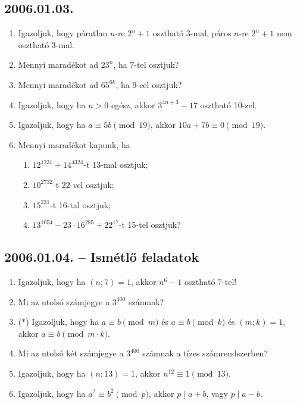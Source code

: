 \documentclass{article}
\newenvironment{abc}{\begin{enumerate}[label=\textit{\alph*})]}{\end{enumerate}}
\begin{document}
\subsection*{2006.01.03.}
\begin{enumerate}
 
\item Igazoljuk, hogy páratlan $n$-re $2^n+1$ osztható 3-mal, páros $n$-re $2^n+1$ nem osztható 3-mal. 

\item Mennyi maradékot ad $23^n$, ha 7-tel osztjuk?

\item Mennyi maradékot ad $65^{6k}$, ha 9-cel osztjuk?

\item Igazoljuk, hogy ha $n>0$ egész, akkor $3^{4n+3}-17$ osztható 10-zel.

\item Igazoljuk, hogy ha $a \equiv 5b \pmod{19}$, akkor $10a+7b \equiv 0 \pmod{19}$.

\item Mennyi maradékot kapunk, ha 

\begin{abc}

	\item $12^{1231}+14^{4324}$-t 13-mal osztjuk;
	\item $10^{2732}$-t 22-vel osztjuk;
	\item $15^{231}$-t 16-tal osztjuk;
	\item $13^{1054}-23 \cdot 16^{285}+22^{17}$-t 15-tel osztjuk?
 
\end{abc}

\end{enumerate}

\subsection*{2006.01.04. -- Ismétlő feladatok}
\begin{enumerate}
\item Igazoljuk, hogy ha $(n;7)=1$, akkor $n^6-1$ osztható 7-tel!

\item Mi az utolsó számjegye a $3^{400}$ számnak?

\item ($*$) Igazoljuk, hogy ha $a\equiv b \pmod m$ és $a \equiv b \pmod k$ és $(m;k)=1$, akkor 
$a\equiv b \pmod {m \cdot k}$.

\item Mi az utolsó két számjegye a $3^{400}$ számnak a tízes számrendszerben?

\item Igazoljuk, hogy ha $(n;13)=1$, akkor $n^{12} \equiv 1 \pmod {13}$.

\item Igazoljuk, hogy ha $a^2 \equiv b^2 \pmod p$, akkor $p \mid a+b$, vagy $p \mid a-b$. 
\end{enumerate}
\end{document}
